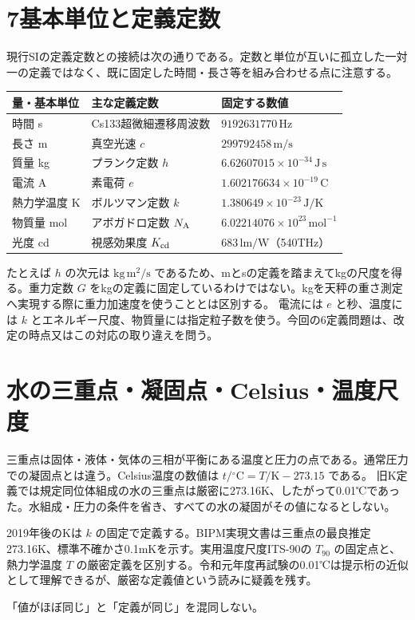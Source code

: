 \section{7基本単位と定義定数}\label{theory:units:definition}
現行SIの定義定数との接続は次の通りである。定数と単位が互いに孤立した一対一の定義ではなく、既に固定した時間・長さ等を組み合わせる点に注意する。
\begin{center}
\begin{tabular}{lll}
量・基本単位 & 主な定義定数 & 固定する数値\\\hline
時間 s & Cs133超微細遷移周波数 & \(9192631770\,\mathrm{Hz}\)\\
長さ m & 真空光速 \(c\) & \(299792458\,\mathrm{m/s}\)\\
質量 kg & プランク定数 \(h\) & \(6.62607015\times10^{-34}\,\mathrm{J\,s}\)\\
電流 A & 素電荷 \(e\) & \(1.602176634\times10^{-19}\,\mathrm C\)\\
熱力学温度 K & ボルツマン定数 \(k\) & \(1.380649\times10^{-23}\,\mathrm{J/K}\)\\
物質量 mol & アボガドロ定数 \(N_{\rm A}\) & \(6.02214076\times10^{23}\,\mathrm{mol^{-1}}\)\\
光度 cd & 視感効果度 \(K_{\rm cd}\) & \(683\,\mathrm{lm/W}\)（540THz）\\
\end{tabular}
\end{center}
たとえば \(h\) の次元は \(\mathrm{kg\,m^2/s}\) であるため、mとsの定義を踏まえてkgの尺度を得る。重力定数 \(G\) をkgの定義に固定しているわけではない。kgを天秤の重さ測定へ実現する際に重力加速度を使うこととは区別する。
電流には \(e\) と秒、温度には \(k\) とエネルギー尺度、物質量には指定粒子数を使う。今回の6定義問題は、改定の時点又はこの対応の取り違えを問う\cite{si_cgpm2018}。

\section{水の三重点・凝固点・Celsius・温度尺度}\label{theory:units:temperature}
三重点は固体・液体・気体の三相が平衡にある温度と圧力の点である。通常圧力での凝固点とは違う。Celsius温度の数値は \(t/{}^\circ\mathrm C=T/\mathrm K-273.15\) である。
旧K定義では規定同位体組成の水の三重点は厳密に273.16K、したがって0.01℃であった。水組成・圧力の条件を省き、すべての水の凝固がその値になるとしない\cite{si_kelvin2007}。
\begin{tcolorbox}[title=改定後の三重点は熱力学温度の厳密定義値ではない]
2019年後のKは \(k\) の固定で定義する。BIPM実現文書は三重点の最良推定273.16K、標準不確かさ0.1mKを示す。実用温度尺度ITS-90の \(T_{90}\) の固定点と、熱力学温度 \(T\) の厳密定義を区別する。令和元年度再試験の0.01℃は提示桁の近似として理解できるが、厳密な定義値という読みに疑義を残す。
\end{tcolorbox}
「値がほぼ同じ」と「定義が同じ」を混同しない\cite{si_kelvin_realization}。

